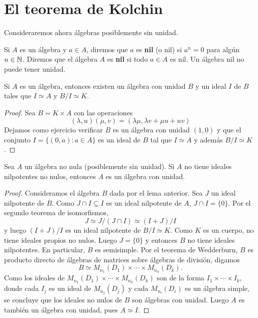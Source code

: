 \chapter{El teorema de Kolchin}

Consideraremos ahora álgebras posiblemente sin unidad. 

Si $A$ es un álgebra y $a\in A$, diremos que $a$ es \textbf{nil} (o nil) si 
$a^n=0$ para algún $n\in\mathbb{N}$. Diremos que el álgebra $A$ es \textbf{nil} si
todo $a\in A$ es nil.  Un álgebra nil no puede tener unidad. 

\begin{lemma}
Si $A$ es un álgebra, entonces existen un álgebra con unidad $B$ y un ideal $I$ 
de $B$ tales que $I\simeq A$ y $B/I\simeq K$.  
\end{lemma}

\begin{proof}
Sea $B=K\times A$ con las operaciones
\[
(\lambda,u)(\mu,v)=(\lambda\mu,\lambda v+\mu u+uv)
\]
Dejamos como ejercicio verificar $B$ es un álgebra
con unidad $(1,0)$ y que el conjunto 
$I=\{(0,a):a\in A\}$ es un ideal de $B$ 
tal que $I\simeq A$ y además $B/I\simeq K$. 
\end{proof}

\begin{proposition}
Sea $A$ un álgebra no nula (posiblemente sin unidad). Si $A$ no tiene ideales
nilpotentes no nulos, entonces $A$ es un álgebra con unidad. 
\end{proposition}

\begin{proof}
Consideramos el álgebra $B$ dada por el lema anterior. 
Sea $J$ un ideal nilpotente de $B$. Como $J\cap I\subseteq I$ es un ideal
nilpotente de $A$, $J\cap I=\{0\}$. Por el segundo teorema de isomorfismos,
\[
J\simeq J/(J\cap I)\simeq (I+J)/I
\]
y luego $(I+J)/I$ es un ideal nilpotente de $B/I\simeq K$. Como $K$ es un cuerpo,
no tiene ideales propios no nulos. Luego $J=\{0\}$ y entonces
$B$ no tiene ideales nilpotentes. En particular, $B$ es semisimple. Por el 
teorema de Wedderburn, $B$ es producto directo de álgebras de matrices
sobre álgebras de división,
digamos
\[
B\simeq M_{n_1}(D_1)\times\cdots\times M_{n_k}(D_k).
\]
Como los ideales de $M_{n_1}(D_1)\times\cdots\times M_{n_k}(D_k)$ 
son de la forma $I_1\times\cdots\times I_k$, donde cada $I_j$ es un ideal de $M_{n_j}(D_j)$ y  
cada $M_{n_i}(D_i)$ es un álgebra simple, se concluye que los ideales no nulos de $B$
son álgebras con unidad. Luego $A$ es también un álgebra con unidad,
pues $A\simeq I$.    
\end{proof}


